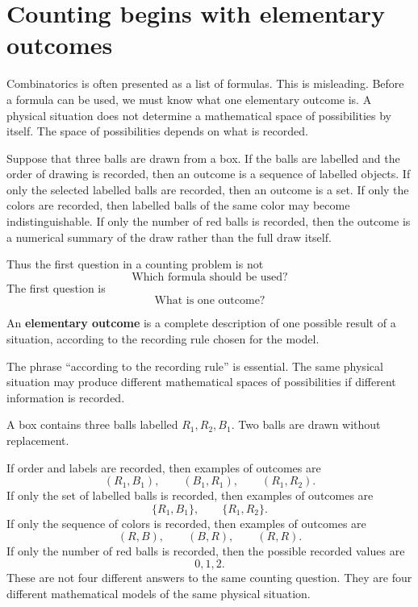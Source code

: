 \section{Counting begins with elementary outcomes}

Combinatorics is often presented as a list of formulas. This is misleading. Before a formula can be used, we must know what one elementary outcome is. A physical situation does not determine a mathematical space of possibilities by itself. The space of possibilities depends on what is recorded.

Suppose that three balls are drawn from a box. If the balls are labelled and the order of drawing is recorded, then an outcome is a sequence of labelled objects. If only the selected labelled balls are recorded, then an outcome is a set. If only the colors are recorded, then labelled balls of the same color may become indistinguishable. If only the number of red balls is recorded, then the outcome is a numerical summary of the draw rather than the full draw itself.

Thus the first question in a counting problem is not
\[
\text{Which formula should be used?}
\]
The first question is
\[
\text{What is one outcome?}
\]

\begin{definitionbox}
An \textbf{elementary outcome} is a complete description of one possible result of a situation, according to the recording rule chosen for the model.
\end{definitionbox}

The phrase ``according to the recording rule'' is essential. The same physical situation may produce different mathematical spaces of possibilities if different information is recorded.

\begin{examplebox}
A box contains three balls labelled \(R_1,R_2,B_1\). Two balls are drawn without replacement.

If order and labels are recorded, then examples of outcomes are
\[
(R_1,B_1),\qquad (B_1,R_1),\qquad (R_1,R_2).
\]
If only the set of labelled balls is recorded, then examples of outcomes are
\[
\{R_1,B_1\},\qquad \{R_1,R_2\}.
\]
If only the sequence of colors is recorded, then examples of outcomes are
\[
(R,B),\qquad (B,R),\qquad (R,R).
\]
If only the number of red balls is recorded, then the possible recorded values are
\[
0,1,2.
\]
These are not four different answers to the same counting question. They are four different mathematical models of the same physical situation.
\end{examplebox}

